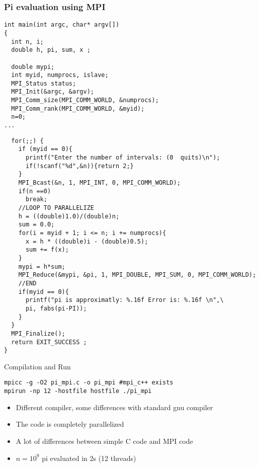 \documentclass[12pt]{beamer}
\begin{document}
\begin{frame}[fragile]
  \frametitle{Pi evaluation using MPI}
  \begin{verbatim}
int main(int argc, char* argv[])
{
  int n, i;
  double h, pi, sum, x ;
  
  double mypi;
  int myid, numprocs, islave;
  MPI_Status status;
  MPI_Init(&argc, &argv);
  MPI_Comm_size(MPI_COMM_WORLD, &numprocs);
  MPI_Comm_rank(MPI_COMM_WORLD, &myid);
  n=0;
...
  \end{verbatim}
\end{frame}

\begin{frame}[fragile]
  \begin{verbatim}
  for(;;) {
    if (myid == 0){
      printf("Enter the number of intervals: (0  quits)\n"); 
      if(!scanf("%d",&n)){return 2;}
    }
    MPI_Bcast(&n, 1, MPI_INT, 0, MPI_COMM_WORLD);
    if(n ==0)
      break;
    //LOOP TO PARALLELIZE
    h = ((double)1.0)/(double)n;
    sum = 0.0;
    for(i = myid + 1; i <= n; i += numprocs){
      x = h * ((double)i - (double)0.5);
      sum += f(x);
    }
    mypi = h*sum;
    MPI_Reduce(&mypi, &pi, 1, MPI_DOUBLE, MPI_SUM, 0, MPI_COMM_WORLD);
    //END
    if(myid == 0){
      printf("pi is approximatly: %.16f Error is: %.16f \n",\
      pi, fabs(pi-PI));
    }
  }
  MPI_Finalize();
  return EXIT_SUCCESS ;
}
  \end{verbatim}
\end{frame}

\begin{frame}[fragile]
  \begin{block}{Compilation and Run}
    \begin{verbatim}
mpicc -g -O2 pi_mpi.c -o pi_mpi #mpi_c++ exists
mpirun -np 12 -hostfile hostfile ./pi_mpi
    \end{verbatim}
  \end{block}
  \begin{block}{}
    \begin{itemize}[<+->]
    \item Different compiler, some differences with standard gnu compiler
    \item The code is completely parallelized
    \item A lot of differences between simple C code and MPI code
    \item $n = 10^9$ pi evaluated in 2s (12 threads)
    \end{itemize}
  \end{block}
\end{frame}
\end{document}
